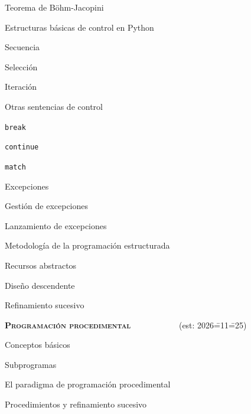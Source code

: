 \begin{longenum}
\begin{longenum}
\begin{longenum}
\begin{longenum}
            \end{longenum}
            \item Teorema de Böhm-Jacopini
        \end{longenum}
        \item Estructuras básicas de control en Python
        \begin{longenum}
            \item Secuencia
            \item Selección
            \item Iteración
            \item Otras sentencias de control
            \begin{longenum}
                \item \texttt{break}
                \item \texttt{continue}
                \item \texttt{match}
                \item Excepciones
                \begin{longenum}
                    \item Gestión de excepciones
                    \item Lanzamiento de excepciones
                \end{longenum}
            \end{longenum}
        \end{longenum}
        \item Metodología de la programación estructurada
        \begin{longenum}
            \item Recursos abstractos
            \item Diseño descendente
            \item Refinamiento sucesivo
        \end{longenum}
    \end{longenum}
    \item \textbf{\textsc{Programación procedimental}} \ \ \ \ \ \ \ \ \ \ \ (est: 2026\==11\==25)
    \begin{longenum}
        \item Conceptos básicos
        \begin{longenum}
            \item Subprogramas
            \item El paradigma de programación procedimental
            \item Procedimientos y refinamiento sucesivo

\end{longenum}
\end{longenum}
\end{longenum}
